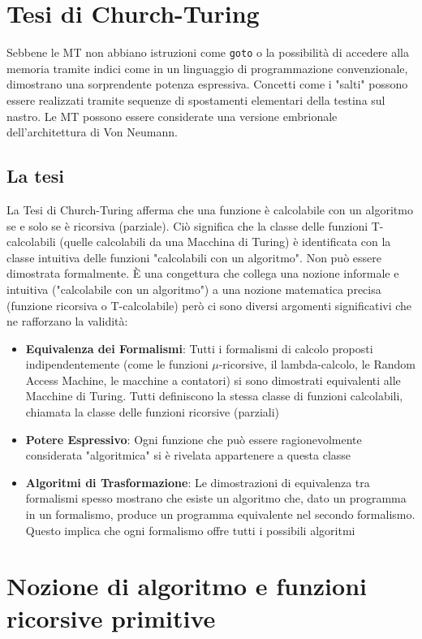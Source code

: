 \documentclass[12pt, a4paper]{report}
\begin{document}
        \section{Tesi di Church-Turing}
            Sebbene le MT non abbiano istruzioni come \texttt{goto} o la possibilità di accedere alla memoria tramite indici come in un linguaggio di programmazione convenzionale, dimostrano una sorprendente potenza espressiva. Concetti come i "salti" possono essere realizzati tramite sequenze di spostamenti elementari della testina sul nastro. Le MT possono essere considerate una versione embrionale dell'architettura di Von Neumann.
            \subsection{La tesi}
                La Tesi di Church-Turing afferma che una funzione è calcolabile con un algoritmo se e solo se è ricorsiva (parziale). Ciò significa che la classe delle funzioni T-calcolabili (quelle calcolabili da una Macchina di Turing) è identificata con la classe intuitiva delle funzioni "calcolabili con un algoritmo". Non può essere dimostrata formalmente. È una congettura che collega una nozione informale e intuitiva ("calcolabile con un algoritmo") a una nozione matematica precisa (funzione ricorsiva o T-calcolabile) però ci sono diversi argomenti significativi che ne rafforzano la validità:
                \begin{itemize}
                    \item \textbf{Equivalenza dei Formalismi}: Tutti i formalismi di calcolo proposti indipendentemente (come le funzioni $\mu$-ricorsive, il lambda-calcolo, le Random Access Machine, le macchine a contatori) si sono dimostrati equivalenti alle Macchine di Turing. Tutti definiscono la stessa classe di funzioni calcolabili, chiamata la classe delle funzioni ricorsive (parziali)
                    \item \textbf{Potere Espressivo}: Ogni funzione che può essere ragionevolmente considerata "algoritmica" si è rivelata appartenere a questa classe
                    \item \textbf{Algoritmi di Trasformazione}: Le dimostrazioni di equivalenza tra formalismi spesso mostrano che esiste un algoritmo che, dato un programma in un formalismo, produce un programma equivalente nel secondo formalismo. Questo implica che ogni formalismo offre tutti i possibili algoritmi
                \end{itemize}
        \section{Nozione di algoritmo e funzioni ricorsive primitive}
\end{document}
